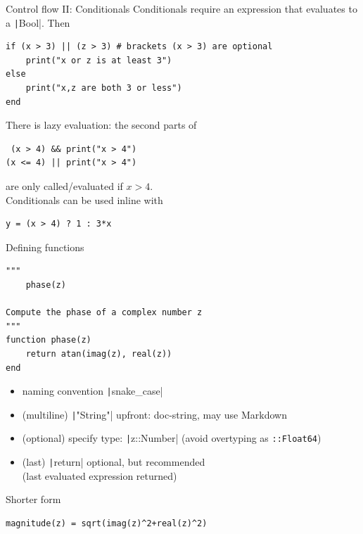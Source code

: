 \documentclass[aspectratio=169, 11pt, handout]{beamer}
\begin{document}
    \begin{frame}[fragile]{Control flow II: Conditionals}
        \alert{Conditionals} require an expression that evaluates to a \texttt|Bool|. Then
        \begin{verbatim}
if (x > 3) || (z > 3) # brackets (x > 3) are optional
    print("x or z is at least 3")
else
    print("x,z are both 3 or less")
end
        \end{verbatim}
        \pause
        There is \alert{lazy evaluation}: the second parts of
        \begin{verbatim}
 (x > 4) && print("x > 4")
(x <= 4) || print("x > 4")
        \end{verbatim}
        are only called/evaluated if $x > 4$.
        \\[\baselineskip]
        \pause
        Conditionals can be used inline with
        \begin{verbatim}
y = (x > 4) ? 1 : 3*x
        \end{verbatim}
    \end{frame}
    \begin{frame}[fragile]{Defining functions}
        \begin{verbatim}
"""
    phase(z)

Compute the phase of a complex number z
"""
function phase(z)
    return atan(imag(z), real(z))
end
        \end{verbatim}
        \begin{itemize}
            \item \alert{naming convention} \texttt|snake_case|
            \pause
            \item (multiline) \texttt|"String"| upfront: doc-string, may use  Markdown
            \pause
            \item (optional) specify type: \texttt|z::Number| (\alert{avoid} overtyping as \texttt{::Float64})
            \pause
            \item (last) \texttt|return| optional, but recommended\\
            \hfill(last evaluated expression returned)
        \end{itemize}
    \pause
    Shorter form
    \begin{verbatim}
magnitude(z) = sqrt(imag(z)^2+real(z)^2)
    \end{verbatim}
    \end{frame}
\end{document}
